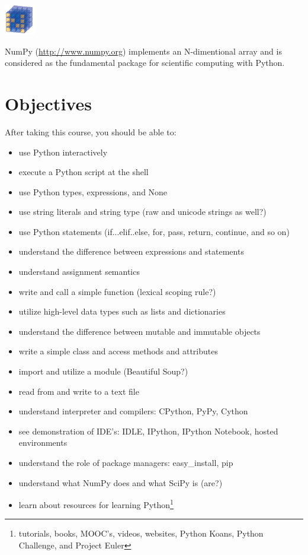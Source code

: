 \documentclass{tufte-handout}
\begin{document}
\begin{marginfigure}%
  \includegraphics[width=0.4\linewidth]{numpy}
  \caption{NumPy (\url{http://www.numpy.org}) implements an N-dimentional
    array and is considered as the fundamental package for
    scientific computing with Python.}
  \label{fig:NumPy}
\end{marginfigure} 

\section{Objectives}\label{sec:objectives }
After taking this course, you should be able to:
\begin{itemize} \itemsep1pt \parskip0pt 
  \item use Python interactively
  \item execute a Python script at the shell
  \item use Python types, expressions, and None
  \item use string literals and string type (raw and unicode strings as well?)
  \item use Python statements (if...elif..else, for, pass, return,
continue, and so on)
  \item understand the difference between expressions and statements
  \item understand assignment semantics
  \item write and call a simple function (lexical scoping rule?)
  \item utilize high-level data types such as lists and dictionaries
  \item understand the difference between mutable and immutable objects
  \item write a simple class and access methods and attributes
  \item import and utilize a module (Beautiful Soup?)
  \item read from and write to a text file
  \item understand interpreter and compilers: CPython, PyPy, Cython
  \item see demonstration of IDE's: IDLE, IPython, IPython Notebook, hosted
environments
  \item understand the role of package managers: easy\_install, pip
  \item understand what NumPy does and what SciPy is (are?) 
  \item learn about resources for learning Python\footnote{tutorials,
        books, MOOC's, videos, websites, Python Koans, Python Challenge, and
        Project Euler}

\end{itemize}
\end{document}
